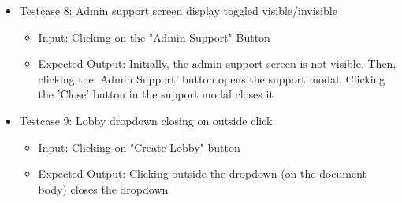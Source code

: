 \begin{itemize}
    \item Testcase 8: Admin support screen display toggled visible/invisible
    \begin{itemize}
        \item Input: Clicking on the "Admin Support" Button
        \item Expected Output: Initially, the admin support screen is not visible. Then, clicking the 'Admin Support' button opens the support modal. Clicking the 'Close' button in the support modal closes it
    \end{itemize}
    
    \item Testcase 9: Lobby dropdown closing on outside click
    \begin{itemize}
        \item Input: Clicking on "Create Lobby" button
        \item Expected Output: Clicking outside the dropdown (on the document body) closes the dropdown
    \end{itemize}
\end{itemize}

